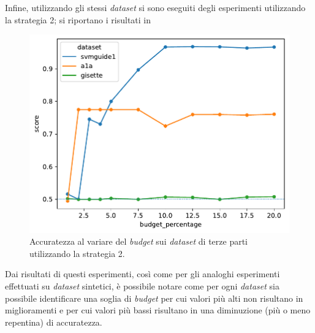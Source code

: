 Infine, utilizzando gli stessi \emph{dataset} si sono eseguiti degli esperimenti utilizzando la strategia 2; si riportano i risultati in~
\begin{figure}
    \centering
    \includegraphics[width=0.5\linewidth]{img//TP/tp_new_strategy.pdf}
    \caption[Risultati su \emph{dataset} di terze parti utilizzando la strategia 2.]{Accuratezza al variare del \emph{budget} sui \emph{dataset} di terze parti utilizzando la strategia 2.}
    \label{fig:TP_new_strategy}
\end{figure}
Dai risultati di questi esperimenti, così come per gli analoghi esperimenti effettuati su \emph{dataset} sintetici, è possibile notare come per ogni \emph{dataset} sia possibile identificare una soglia di \emph{budget} per cui valori più alti non risultano in miglioramenti e per cui valori più bassi risultano in una diminuzione (più o meno repentina) di accuratezza.

